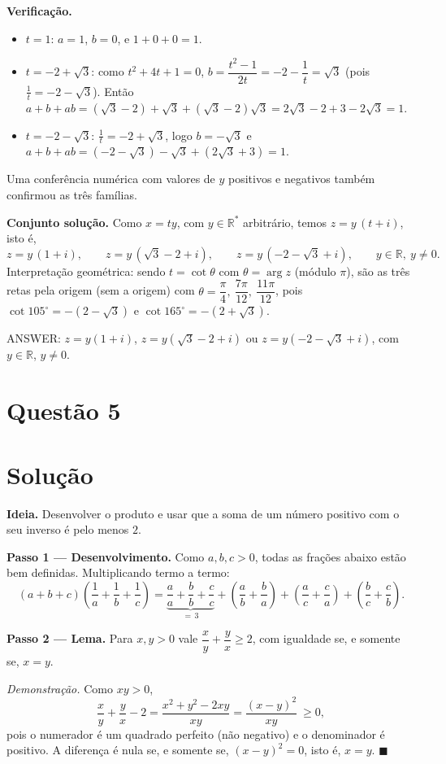 \documentclass{article}%
\begin{document}
\textbf{Verificação.}
\begin{itemize}
\item $t=1$: $a=1$, $b=0$, e $1+0+0=1$. \checkmark
\item $t=-2+\sqrt3$: como $t^2+4t+1=0$, $b=\dfrac{t^2-1}{2t}=-2-\dfrac1t=\sqrt3$ (pois $\tfrac1t=-2-\sqrt3$). Então $a+b+ab=(\sqrt3-2)+\sqrt3+(\sqrt3-2)\sqrt3=2\sqrt3-2+3-2\sqrt3=1$. \checkmark
\item $t=-2-\sqrt3$: $\tfrac1t=-2+\sqrt3$, logo $b=-\sqrt3$ e $a+b+ab=(-2-\sqrt3)-\sqrt3+(2\sqrt3+3)=1$. \checkmark
\end{itemize}
Uma conferência numérica com valores de $y$ positivos e negativos também confirmou as três famílias.

\textbf{Conjunto solução.} Como $x=ty$, com $y\in\mathbb{R}^*$ arbitrário, temos $z=y\,(t+i)$, isto é,
\[
z=y\,(1+i),\qquad z=y\,(\sqrt3-2+i),\qquad z=y\,(-2-\sqrt3+i),\qquad y\in\mathbb{R},\ y\neq0 .
\]
Interpretação geométrica: sendo $t=\cot\theta$ com $\theta=\arg z$ (módulo $\pi$), são as três retas pela origem (sem a origem) com $\theta=\dfrac{\pi}{4},\ \dfrac{7\pi}{12},\ \dfrac{11\pi}{12}$, pois $\cot 105^\circ=-(2-\sqrt3)$ e $\cot 165^\circ=-(2+\sqrt3)$.

ANSWER: $z=y(1+i)$, $z=y(\sqrt3-2+i)$ ou $z=y(-2-\sqrt3+i)$, com $y\in\mathbb{R}$, $y\neq 0$.%
\newpage%
\section*{Questão 5}

\section*{Solução}

\textbf{Ideia.} Desenvolver o produto e usar que a soma de um número positivo com o seu inverso é pelo menos $2$.

\textbf{Passo 1 --- Desenvolvimento.} Como $a,b,c>0$, todas as frações abaixo estão bem definidas. Multiplicando termo a termo:
\[
(a+b+c)\left(\frac1a+\frac1b+\frac1c\right)
=\underbrace{\frac aa+\frac bb+\frac cc}_{=\,3}
+\left(\frac ab+\frac ba\right)+\left(\frac ac+\frac ca\right)+\left(\frac bc+\frac cb\right).
\]

\textbf{Passo 2 --- Lema.} Para $x,y>0$ vale $\dfrac xy+\dfrac yx\ge 2$, com igualdade se, e somente se, $x=y$.

\emph{Demonstração.} Como $xy>0$,
\[
\frac xy+\frac yx-2=\frac{x^2+y^2-2xy}{xy}=\frac{(x-y)^2}{xy}\ \ge 0 ,
\]
pois o numerador é um quadrado perfeito (não negativo) e o denominador é positivo. A diferença é nula se, e somente se, $(x-y)^2=0$, isto é, $x=y$. $\blacksquare$
\end{document}
